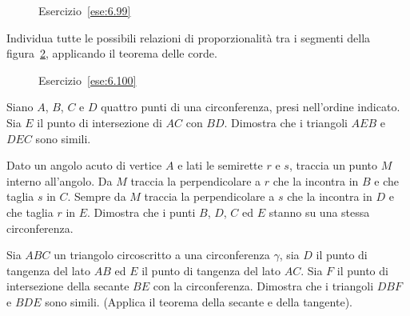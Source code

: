 \begin{inaccessibleblock}
 \begin{figure}[!htb]
	\centering
	\caption{Esercizio~\ref{ese:6.99}}\label{fig:ese6.99}
\end{figure}
\end{inaccessibleblock}

\begin{esercizio}
\label{ese:6.100}
Individua tutte le possibili relazioni di proporzionalità tra i 
segmenti della figura~\ref{fig:ese6.100}, applicando il teorema delle 
corde.
\end{esercizio}


\begin{inaccessibleblock}
 \begin{figure}[!htb]
	\centering
	\caption{Esercizio~\ref{ese:6.100}}\label{fig:ese6.100}
\end{figure}
\end{inaccessibleblock}

\begin{esercizio}
\label{ese:6.101}
Siano \(A\), \(B\), \(C\) e \(D\) quattro punti di una circonferenza, presi 
nell'ordine indicato. Sia \(E\) il punto di intersezione di \(AC\) con 
\(BD\). Dimostra che i triangoli \(AEB\) e \(DEC\) sono simili.
\end{esercizio}

\begin{esercizio}
\label{ese:6.102}
Dato un angolo acuto di vertice \(A\) e lati le semirette \(r\) e \(s\), 
traccia un punto \(M\) interno all'angolo. Da \(M\) traccia la 
perpendicolare a \(r\) che la incontra in \(B\) e che taglia \(s\) in \(C\). 
Sempre da \(M\) traccia la perpendicolare a \(s\) che la incontra in \(D\) 
e che taglia \(r\) in \(E\). Dimostra che i punti \(B\), \(D\), \(C\) ed \(E\) 
stanno su una stessa circonferenza. 
\end{esercizio}

\begin{esercizio}
\label{ese:6.103}
Sia \(ABC\) un triangolo circoscritto a una circonferenza \(\gamma\), sia 
\(D\) il punto di tangenza del lato \(AB\) ed \(E\) il punto di tangenza 
del lato \(AC\). Sia \(F\) il punto di intersezione della secante \(BE\) con 
la circonferenza. Dimostra che i triangoli \(DBF\) e \(BDE\) sono simili. 
(Applica il teorema della secante e della tangente).
\end{esercizio}

